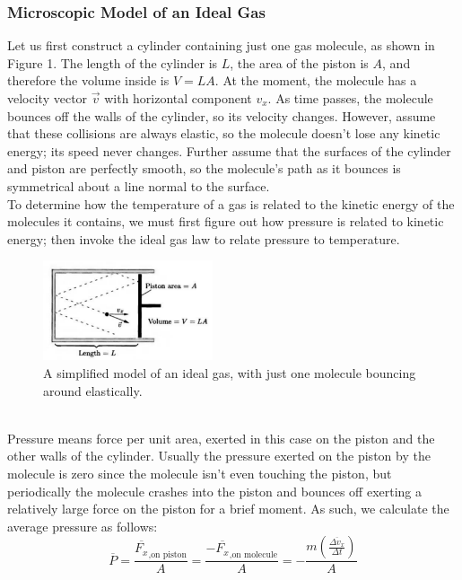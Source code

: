 \documentclass[11pt]{exam}
\begin{document}
\subsubsection*{Microscopic Model of an Ideal Gas}
\hspace*{10mm}Let us first construct a cylinder containing just one gas molecule, as shown in Figure 1. The length of the cylinder is $L$, the area of the piston is $A$, and therefore the volume inside is $V=LA$. At the moment, the molecule has a velocity vector $\vec{v}$ with horizontal component $v_x$. As time passes, the molecule bounces off the walls of the cylinder, so its velocity changes. However, assume that these collisions are always elastic, so the molecule doesn't lose any kinetic energy; its speed never changes. Further assume that the surfaces of the cylinder and piston are perfectly smooth, so the molecule's path as it bounces is symmetrical about a line normal to the surface. \\
\hspace*{10mm}To determine how the temperature of a gas is related to the kinetic energy of the molecules it contains, we must first figure out how pressure is related to kinetic energy; then invoke the ideal gas law to relate pressure to temperature.  
\begin{figure}[htp]
    \centering
    \includegraphics[width=5cm]{figure1.png}
    \caption{A simplified model of an ideal gas, with just one molecule bouncing around elastically.}
\label{fig:simplified_piston}
\end{figure}\\
\hspace*{10mm}Pressure means force per unit area, exerted in this case on the piston and the other walls of the cylinder. Usually the pressure exerted on the piston by the molecule is zero since the molecule isn't even touching the piston, but periodically the molecule crashes into the piston and bounces off exerting a relatively large force on the piston for a brief moment. As such, we calculate the average pressure as follows:
\begin{equation}\tag{1.9}
\overline{P} = \frac{\overline{F_x}_{\text{,on piston}}}{A}=\frac{-\overline{F_x}_{\text{,on molecule}}}{A}=-\frac{m\left(\frac{\overline{\Delta v_x}}{\Delta t}\right)}{A}
\end{equation}
\end{document}
